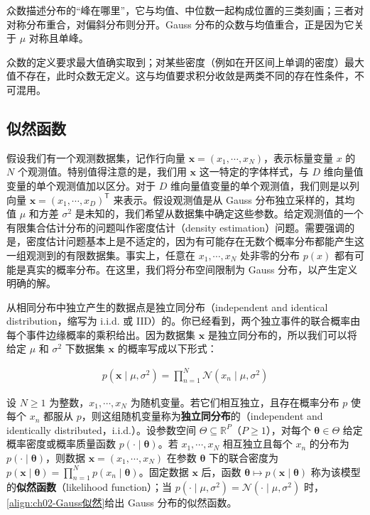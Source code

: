 \documentclass[../../main.tex]{subfiles}
\begin{document}
\begin{remark}
众数描述分布的“峰在哪里”，它与均值、中位数一起构成位置的三类刻画；三者对对称分布重合，对偏斜分布则分开。Gauss 分布的众数与均值重合，正是因为它关于 $\mu$ 对称且单峰。

众数的定义要求最大值确实取到；对某些密度（例如在开区间上单调的密度）最大值不存在，此时众数无定义。这与均值要求积分收敛是两类不同的存在性条件，不可混用。
\end{remark}

\subsection{似然函数}\label{subsection:ch02-似然函数}

假设我们有一个观测数据集，记作行向量 $\mathbf{x}=(x_1,\cdots,x_N)$，表示标量变量 $x$ 的 $N$ 个观测值。特别值得注意的是，我们用 $\mathbf{x}$ 这一特定的字体样式，与 $D$ 维向量值变量的单个观测值加以区分。对于 $D$ 维向量值变量的单个观测值，我们则是以列向量 $\mathbf{x}=(x_1,\cdots,x_D)^{\mathsf{T}}$ 来表示。假设观测值是从 Gauss 分布独立采样的，其均值 $\mu$ 和方差 $\sigma^{2}$ 是未知的，我们希望从数据集中确定这些参数。给定观测值的一个有限集合估计分布的问题叫作密度估计（density estimation）问题。需要强调的是，密度估计问题基本上是不适定的，因为有可能存在无数个概率分布都能产生这一组观测到的有限数据集。事实上，任意在 $x_1,\cdots,x_N$ 处非零的分布 $p(x)$ 都有可能是真实的概率分布。在这里，我们将分布空间限制为 Gauss 分布，以产生定义明确的解。

从相同分布中独立产生的数据点是独立同分布（independent and identical distribution，缩写为 i.i.d. 或 IID）的。你已经看到，两个独立事件的联合概率由每个事件边缘概率的乘积给出。因为数据集 $\mathbf{x}$ 是独立同分布的，所以我们可以将给定 $\mu$ 和 $\sigma^{2}$ 下数据集 $\mathbf{x}$ 的概率写成以下形式：

\begin{align}
  p(\mathbf{x}\mid\mu,\sigma^{2}) = \prod_{n=1}^{N}\mathcal{N}(x_n\mid\mu,\sigma^{2})
  \label{align:ch02-Gauss似然}
\end{align}

\begin{definition}[独立同分布与似然函数]\label{definition:ch02-似然函数}
设 $N\geqslant1$ 为整数，$x_1,\cdots,x_N$ 为随机变量。若它们相互独立，且存在概率分布 $p$ 使每个 $x_n$ 都服从 $p$，则这组随机变量称为\textbf{独立同分布}的（independent and identically distributed，i.i.d.）。设参数空间 $\Theta\subseteq\mathbb{R}^{P}$（$P\geqslant1$），对每个 $\boldsymbol{\theta}\in\Theta$ 给定概率密度或概率质量函数 $p(\cdot\mid\boldsymbol{\theta})$。若 $x_1,\cdots,x_N$ 相互独立且每个 $x_n$ 的分布为 $p(\cdot\mid\boldsymbol{\theta})$，则数据 $\mathbf{x}=(x_1,\cdots,x_N)$ 在参数 $\boldsymbol{\theta}$ 下的联合密度为 $p(\mathbf{x}\mid\boldsymbol{\theta})=\prod_{n=1}^{N}p(x_n\mid\boldsymbol{\theta})$。固定数据 $\mathbf{x}$ 后，函数 $\boldsymbol{\theta}\mapsto p(\mathbf{x}\mid\boldsymbol{\theta})$ 称为该模型的\textbf{似然函数}（likelihood function）；当 $p(\cdot\mid\mu,\sigma^{2})=\mathcal{N}(\cdot\mid\mu,\sigma^{2})$ 时，\eqref{align:ch02-Gauss似然}给出 Gauss 分布的似然函数。
\end{definition}
\end{document}
